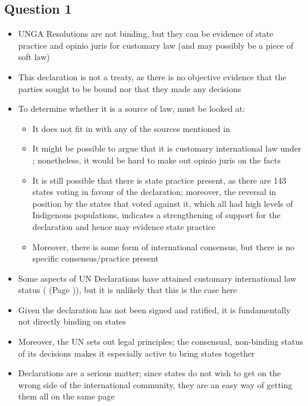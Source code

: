 \subsection*{Question 1}
\begin{itemize}
    \item UNGA Resolutions are not binding, but they can be evidence of state practice and \gls{opinio juris} for customary law (and may possibly be a piece of soft law)
    \item This declaration is not a treaty, as there is no objective evidence that the parties sought to be bound nor that they made any decisions
    \item To determine whether it is a source of law,  must be looked at:
    \begin{itemize}
        \item It does not fit in with any of the sources mentioned in 
        \item It might be possible to argue that it is customary international law under ; nonetheless, it would be hard to make out \gls{opinio juris} on the facts
        \item It is still possible that there is state practice present, as there are 143 states voting in favour of the declaration; moreover, the reversal in position by the states that voted against it, which all had high levels of Indigenous populations, indicates a strengthening of support for the declaration and hence may evidence state practice
        \item Moreover, there is some form of international consensus, but there is no specific consensus/practice present
    \end{itemize}
    \item Some aspects of UN Declarations have attained customary international law status ( (Page \pageref{case:Horta v Commonwealth})), but it is unlikely that this is the case here
    \item Given the declaration has not been signed and ratified, it is fundamentally not directly binding on states
    \item Moreover, the UN sets out legal principles; the consensual, non-binding status of its decisions makes it especially active to bring states together
    \item Declarations are a serious matter; since states do not wish to get on the wrong side of the international community, they are an easy way of getting them all on the same page

\end{itemize}
